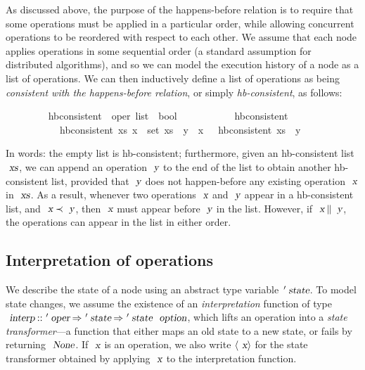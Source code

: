 As discussed above, the purpose of the happens-before relation is to require that some operations must be applied in a particular order, while allowing concurrent operations to be reordered with respect to each other.
We assume that each node applies operations in some sequential order (a standard assumption for distributed algorithms), and so we can model the execution history of a node as a list of operations.
We can then inductively define a list of operations as being \emph{consistent with the happens-before relation}, or simply \emph{hb-consistent}, as follows:
\vspace{0.35em}
\begin{isabellebody}
\ \ \ \ \ \ \ \  hb{\isacharunderscore}consistent\ {\isacharcolon}{\isacharcolon}\ {\isachardoublequoteopen}{\isacharprime}oper\ list\ {\isasymRightarrow}\ bool{\isachardoublequoteclose}\ \isanewline
\ \ \ \ \ \ \ \ \ \ {\isachardoublequoteopen}hb{\isacharunderscore}consistent\ {\isacharbrackleft}{\isacharbrackright}{\isachardoublequoteclose}\ {\isacharbar}\isanewline
\ \ \ \ \ \ \ \ \ \ {\isachardoublequoteopen}{\isasymlbrakk}\ hb{\isacharunderscore}consistent\ xs{\isacharsemicolon}\ {\isasymforall}x\ {\isasymin}\ set\ xs{\isachardot}\ {\isasymnot}\ y\ {\isasymprec}\ x\ {\isasymrbrakk}\ {\isasymLongrightarrow}\ hb{\isacharunderscore}consistent\ {\isacharparenleft}xs\ {\isacharat}\ {\isacharbrackleft}y{\isacharbrackright}{\isacharparenright}{\isachardoublequoteclose}
\end{isabellebody}
\vspace{0.35em}
In words: the empty list is hb-consistent; furthermore, given an hb-consistent list $\isa{xs}$, we can append an operation $\isa{y}$ to the end of the list to obtain another hb-consistent list, provided that $\isa{y}$ does not happen-before any existing operation $\isa{x}$ in $\isa{xs}$. As a result, whenever two operations $\isa{x}$ and $\isa{y}$ appear in a hb-consistent list, and $\isa{x}\prec\isa{y}$, then $\isa{x}$ must appear before $\isa{y}$ in the list. However, if $\isa{x}\mathbin{\isasymparallel}\isa{y}$, the operations can appear in the list in either order.

\subsection{Interpretation of operations}\label{sect.ops.interpretation}

We describe the state of a node using an abstract type variable $\isacharprime\isa{state}$.
To model state changes, we assume the existence of an \emph{interpretation} function of type $\isa{interp} \mathbin{\isacharcolon\isacharcolon} \isacharprime\isa{oper} \mathbin{\isasymRightarrow} \isacharprime\isa{state} \mathbin{\isasymRightarrow} \isacharprime\isa{state}\ \isa{option}$, which lifts an operation into a \emph{state transformer}---a function that either maps an old state to a new state, or fails by returning $\isa{None}$.
If $\isa{x}$ is an operation, we also write $\langle\isa{x}\rangle$ for the state transformer obtained by applying $\isa{x}$ to the interpretation function.

